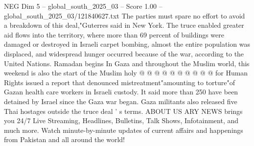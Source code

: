 \begin{textsample}{NEG Dim 5 – global\_south\_2025\_03 – Score 1.00 – global\_south\_2025\_03/121840627.txt}
The parties must spare no effort to avoid a breakdown of this deal,"Guterres said in New York.
The truce enabled greater aid flows into the territory, where more than 69 percent of buildings were damaged or destroyed in Israeli carpet bombing, almost the entire population was displaced, and widespread hunger occurred because of the war, according to the United Nations.
Ramadan begins In Gaza and throughout the Muslim world, this weekend is also the start of the Muslim holy @ @ @ @ @ @ @ @ @ @ for Human Rights issued a report that denounced mistreatment"amounting to torture"of Gazan health care workers in Israeli custody.
It said more than 250 have been detained by Israel since the Gaza war began.
Gaza militants also released five Thai hostages outside the truce deal ' s terms.
ABOUT US ARY NEWS brings you 24/7 Live Streaming, Headlines, Bulletins, Talk Shows, Infotainment, and much more.
Watch minute-by-minute updates of current affairs and happenings from Pakistan and all around the world!

\end{textsample}
